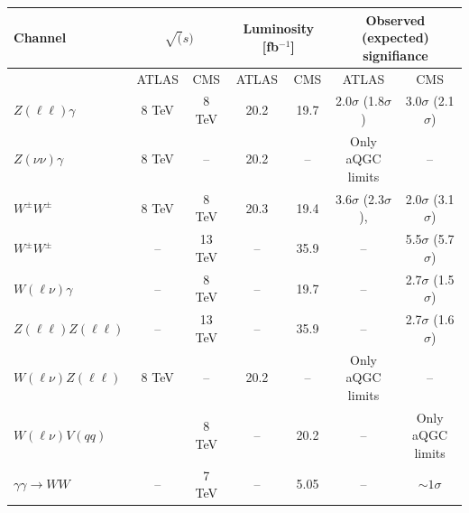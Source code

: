 \begin{table}[htb]
\centering
\begin{tabular}{|l|c|c|c|c|c|c|}
    \hline
    Channel & \multicolumn{2}{c|}{$\sqrt(s)$} & \multicolumn{2}{c|}{Luminosity [fb$^{-1}$]} & \multicolumn{2}{c|}{Observed (expected) signifiance} \\
    \hline
                                 & ATLAS                 & CMS     & ATLAS & CMS  & ATLAS                                                             & CMS                                                  \\
    $Z(\ell\ell)\gamma$          & 8 TeV                 & 8 TeV   & 20.2  & 19.7 & 2.0$\sigma$ (1.8$\sigma$)\cite{Aaboud:2017pds}                    & 3.0$\sigma$ (2.1$\sigma$)\cite{Khachatryan:2017jub}  \\
    $Z(\nu\nu)\gamma$            & 8 TeV                 & --      & 20.2  & --   & Only aQGC limits \cite{Aaboud:2017pds}                            & --                                                   \\
    $W^\pm W^\pm$                & 8 TeV                 & 8 TeV   & 20.3  & 19.4 & 3.6$\sigma$ (2.3$\sigma$)\cite{Aaboud:2016ffv},\cite{Aad:2014zda} & 2.0$\sigma$ (3.1$\sigma$)\cite{Khachatryan:2014sta}  \\
    $W^\pm W^\pm$                &  --                   & 13 TeV  & --    & 35.9 & --                                                                & 5.5$\sigma$ (5.7$\sigma$)\cite{CMS:2017adb}          \\
    $W(\ell\nu)\gamma$           &  --                   & 8 TeV   & --    & 19.7 & --                                                                & 2.7$\sigma$ (1.5$\sigma$) \cite{Khachatryan:2016vif} \\
    $Z(\ell\ell)Z(\ell\ell)$     &  --                   & 13 TeV  & --    & 35.9 & --                                                                & 2.7$\sigma$ (1.6$\sigma$) \cite{Sirunyan:2017fvv}    \\
    $W(\ell\nu)Z(\ell\ell)$      & 8 TeV                 & --      & 20.2  & --   & Only aQGC limits \cite{Aad:2016ett}                               & --                                                   \\
    $W(\ell\nu)V(qq)$            & \cite{Aaboud:2016uuk} & 8 TeV   & --    & 20.2 & --                                                                & Only aQGC limits                                     \\
    $\gamma\gamma\rightarrow WW$ & --                    & 7 TeV   & --    & 5.05 & --                                                                & $\sim 1\sigma$ \cite{Chatrchyan:2013akv}             \\

\end{tabular}
\end{table}
